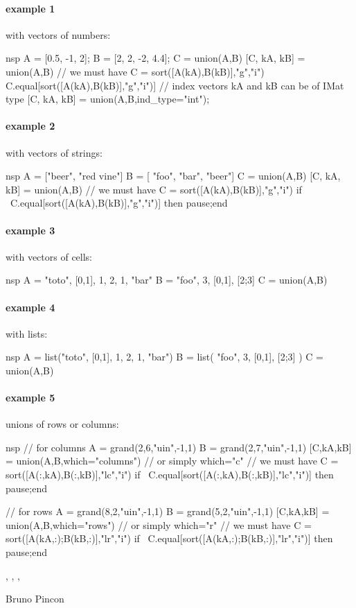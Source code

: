 \begin{examples}
  \paragraph{example 1} with vectors of numbers:
  \begin{mintednsp}{nsp}
    A = [0.5, -1, 2];
    B = [2, 2, -2, 4.4];
    C = union(A,B)
    [C, kA, kB] = union(A,B)
    // we must have C = sort([A(kA),B(kB)],"g","i")
    C.equal[sort([A(kA),B(kB)],"g","i")]
    // index vectors kA and kB can be of IMat type
    [C, kA, kB] = union(A,B,ind_type="int");
  \end{mintednsp}

  \paragraph{example 2} with vectors of strings:
  \begin{mintednsp}{nsp}
    A = ["beer", "red vine"]
    B = [ "foo", "bar", "beer"]
    C = union(A,B)
    [C, kA, kB] = union(A,B)
    // we must have C = sort([A(kA),B(kB)],"g","i")
    if ~C.equal[sort([A(kA),B(kB)],"g","i")] then pause;end
  \end{mintednsp}

  \paragraph{example 3} with vectors of cells:
  \begin{mintednsp}{nsp}
    A = {"toto", [0,1], 1, 2, 1, "bar"}
    B = { "foo",  3, [0,1], [2;3]}
    C = union(A,B)
  \end{mintednsp}
  \paragraph{example 4} with lists:
  \begin{mintednsp}{nsp}
    A = list("toto", [0,1], 1, 2, 1, "bar")
    B = list( "foo", 3, [0,1], [2;3] )
    C = union(A,B)
  \end{mintednsp}
  \paragraph{example 5} unions of rows or columns:
  \begin{mintednsp}{nsp}
    // for columns
    A = grand(2,6,"uin",-1,1)
    B = grand(2,7,"uin",-1,1)
    [C,kA,kB] = union(A,B,which="columns")  // or simply which="c"
    // we must have C = sort([A(:,kA),B(:,kB)],"lc","i")
    if ~C.equal[sort([A(:,kA),B(:,kB)],"lc","i")] then pause;end
    
    // for rows
    A = grand(8,2,"uin",-1,1)
    B = grand(5,2,"uin",-1,1)
    [C,kA,kB] = union(A,B,which="rows")  // or simply which="r"
    // we must have C = sort([A(kA,:);B(kB,:)],"lr","i")
    if ~C.equal[sort([A(kA,:);B(kB,:)],"lr","i")] then pause;end
  \end{mintednsp}
\end{examples}

\begin{manseealso}
  , ,
  , 
\end{manseealso}
\begin{authors}
  Bruno Pincon
\end{authors}
